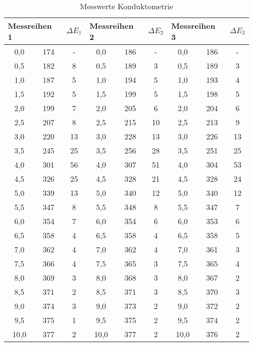 \begin{table}[h!]
	\centering
	\caption{Messwerte Konduktometrie}
	\begin{tabular}{ccc|ccc|ccc}
		\hline
	\multicolumn{2}{l}{\textbf{Messreihen 1}} &       \multicolumn{1}{l}{$\Delta E_1$} & \multicolumn{2}{l}{\textbf{Messreihen 2}} &        \multicolumn{1}{l}{$\Delta E_2$} & \multicolumn{2}{l}{\textbf{Messreihen 3}} & \multicolumn{1}{l}{$\Delta E_3$} \\
	\hline
	0,0   & 174   & - & 0,0   & 186   & - & 0,0   & 186   & -\\
	0,5   & 182   & 8     & 0,5   & 189   & 3     & 0,5   & 189   & 3 \\
	1,0   & 187   & 5     & 1,0   & 194   & 5     & 1,0   & 193   & 4 \\
	1,5   & 192   & 5     & 1,5   & 199   & 5     & 1,5   & 198   & 5 \\
	2,0   & 199   & 7     & 2,0   & 205   & 6     & 2,0   & 204   & 6 \\
	2,5   & 207   & 8     & 2,5   & 215   & 10    & 2,5   & 213   & 9 \\
	3,0   & 220   & 13    & 3,0   & 228   & 13    & 3,0   & 226   & 13 \\
	3,5   & 245   & 25    & 3,5   & 256   & 28    & 3,5   & 251   & 25 \\
	4,0   & 301   & 56    & 4,0   & 307   & 51    & 4,0   & 304   & 53 \\
	4,5   & 326   & 25    & 4,5   & 328   & 21    & 4,5   & 328   & 24 \\
	5,0   & 339   & 13    & 5,0   & 340   & 12    & 5,0   & 340   & 12 \\
	5,5   & 347   & 8     & 5,5   & 348   & 8     & 5,5   & 347   & 7 \\
	6,0   & 354   & 7     & 6,0   & 354   & 6     & 6,0   & 353   & 6 \\
	6,5   & 358   & 4     & 6,5   & 358   & 4     & 6,5   & 358   & 5 \\
	7,0   & 362   & 4     & 7,0   & 362   & 4     & 7,0   & 361   & 3 \\
	7,5   & 366   & 4     & 7,5   & 365   & 3     & 7,5   & 365   & 4 \\
	8,0   & 369   & 3     & 8,0   & 368   & 3     & 8,0   & 367   & 2 \\
	8,5   & 371   & 2     & 8,5   & 371   & 3     & 8,5   & 370   & 3 \\
	9,0   & 374   & 3     & 9,0   & 373   & 2     & 9,0   & 372   & 2 \\
	9,5   & 375   & 1     & 9,5   & 375   & 2     & 9,5   & 374   & 2 \\
	10,0  & 377   & 2     & 10,0  & 377   & 2     & 10,0  & 376   & 2 
\end{tabular}%
\label{tab:potentio_mess}
\end{table}
\FloatBarrier

